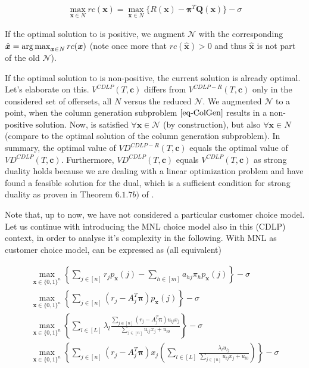 \begin{align}
	\max_{\boldsymbol{x} \in N} rc(\boldsymbol{x}) = \max_{\boldsymbol{x} \in N} \{R(\boldsymbol{x}) - \boldsymbol{\pi}^T \boldsymbol{Q}(\boldsymbol{x})\} - \sigma \label{eq-ColGen}
\end{align}

If the optimal solution to  is positive, we augment $\mathcal{N}$ with the corresponding $\hat{\boldsymbol{x}} = \operatorname*{arg\,max}_{\boldsymbol{x} \in N} rc(\boldsymbol{x})$ (note once more that $rc(\hat{\boldsymbol{x}}) > 0$ and thus $\hat{\boldsymbol{x}}$ is not part of the old $\mathcal{N}$). 

If the optimal solution to  is non-positive, the current solution is already optimal. Let's elaborate on this. $V^{CDLP}(T, \boldsymbol{c})$ differs from $V^{CDLP-R}(T, \boldsymbol{c})$ only in the considered set of offersets, all $N$ versus the reduced $\mathcal{N}$. We augmented $\mathcal{N}$ to a point, when the column generation subproblem $\Cref{eq-ColGen}$ results in a non-positive solution. Now,  is satisfied $\forall \boldsymbol{x} \in \mathcal{N}$ (by construction), but also $\forall \boldsymbol{x} \in N$ (compare to the optimal solution of the column generation subproblem). In summary, the optimal value of $VD^{CDLP-R}(T, \boldsymbol{c})$ equals the optimal value of $VD^{CDLP}(T, \boldsymbol{c})$. Furthermore, $VD^{CDLP}(T, \boldsymbol{c})$ equals $V^{CDLP}(T, \boldsymbol{c})$ as strong duality holds because we are dealing with a linear optimization problem and have found a feasible solution for the dual, which is a sufficient condition for strong duality as proven in Theorem $6.1.7 b)$ of \cite{Gritzmann.2013}.

Note that, up to now, we have not considered a particular customer choice model. Let us continue with introducing the MNL choice model also in this (CDLP) context, in order to analyse it's complexity in the following. With MNL as customer choice model,   can be expressed as (all equivalent)

\begin{align}
\max_{\boldsymbol{x} \in \{0, 1\}^n}\left\{ \sum_{j \in [n]} r_j p_{\boldsymbol{x}}(j) - \sum_{h \in [m]} a_{hj} \pi_h p_{\boldsymbol{x}}(j) \right\} - \sigma\\
\max_{\boldsymbol{x} \in \{0, 1\}^n}\left\{ \sum_{j \in [n]} \left(r_j  - A_j^T\boldsymbol{\pi}\right) p_{\boldsymbol{x}}(j) \right\} - \sigma\\
\max_{\boldsymbol{x} \in \{0, 1\}^n}\left\{ \sum_{l \in [L]} \lambda_l \frac{\sum_{j \in [n]} \left(r_j  - A_j^T\boldsymbol{\pi}\right)u_{lj}x_j}{\sum_{j \in [n]} u_{lj}x_j + u_{l0}} \right\} - \sigma\\
\max_{\boldsymbol{x} \in \{0, 1\}^n}\left\{ \sum_{j \in [n]} \left(r_j  - A_j^T\boldsymbol{\pi}\right) x_j \left( \sum_{l \in [L]} \frac{\lambda_l u_{lj} }{\sum_{j \in [n]} u_{lj}x_j + u_{l0}} \right)\right\} - \sigma\label{eq-ColGen-sub}
\end{align}

